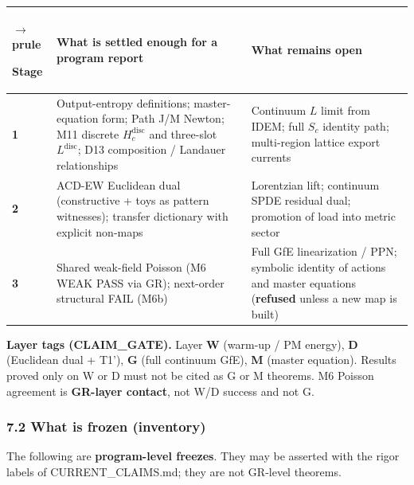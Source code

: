 \documentclass[
  11pt,
]{article}
\newcounter{none} %
\begin{document}
{\def\LTcaptype{none} %
\begin{longtable}[]{@{}
  >{\raggedright\arraybackslash}p{}
  >{\raggedright\arraybackslash}p{}
  >{\raggedright\arraybackslash}p{}@{}}
$\rightarrow$prule\noalign{}
\begin{minipage}[b]{\linewidth}\raggedright
Stage
\end{minipage} & \begin{minipage}[b]{\linewidth}\raggedright
What is settled enough for a program report
\end{minipage} & \begin{minipage}[b]{\linewidth}\raggedright
What remains open
\end{minipage} \\
\midrule\noalign{}
\endhead
\bottomrule\noalign{}
\endlastfoot
\textbf{1} & Output-entropy definitions; master-equation form; Path J/M Newton; M11 discrete \(H_c^{\mathrm{disc}}\) and three-slot \(L^{\mathrm{disc}}\); D13 composition / Landauer relationships & Continuum \(L\) limit from IDEM; full \(S_c\) identity path; multi-region lattice export currents \\
\textbf{2} & ACD-EW Euclidean dual (constructive + toys as pattern witnesses); transfer dictionary with explicit non-maps & Lorentzian lift; continuum SPDE residual dual; promotion of load into metric sector \\
\textbf{3} & Shared weak-field Poisson (M6 WEAK PASS via GR); next-order structural FAIL (M6b) & Full GfE linearization / PPN; symbolic identity of actions and master equations (\textbf{refused} unless a new map is built) \\
\end{longtable}
}

\textbf{Layer tags (CLAIM\_GATE).} Layer \textbf{W} (warm-up / PM energy), \textbf{D} (Euclidean dual + T1'), \textbf{G} (full continuum GfE), \textbf{M} (master equation). Results proved only on W or D must not be cited as G or M theorems. M6 Poisson agreement is \textbf{GR-layer contact}, not W/D success and not G\LeftrightarrowM.

\subsubsection{7.2 What is frozen (inventory)}\label{what-is-frozen-inventory}

The following are \textbf{program-level freezes}. They may be asserted with the rigor labels of CURRENT\_CLAIMS.md; they are not GR-level theorems.
\end{document}
